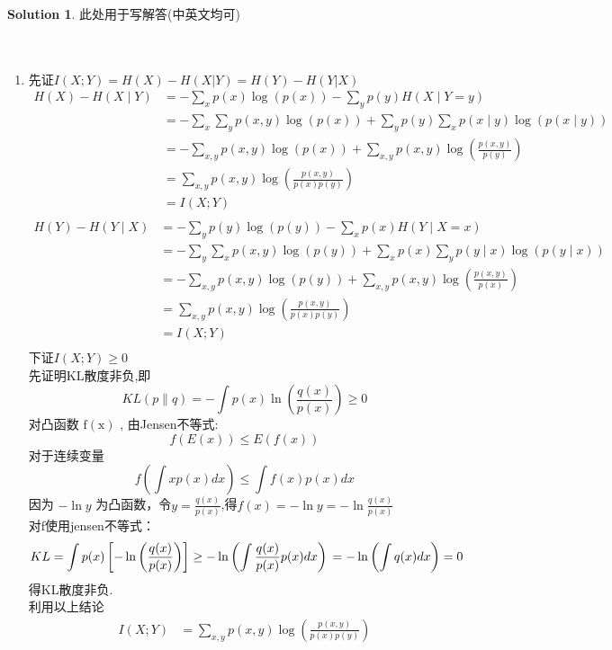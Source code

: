 \documentclass[a4paper,UTF8]{article}
\numberwithin{equation}{section}
\theoremstyle{definition}
\newtheorem*{solution}{Solution}
\begin{document}
\begin{solution}
此处用于写解答(中英文均可)
~\\
~\\
~\\
\begin{enumerate}
	\item[(1)]
	先证$I(X;Y) = H(X) - H(X|Y) = H(Y) - H(Y|X)$
\[
	\begin{aligned}
	H(X)-H(X \mid Y) & =-\sum_x p(x) \log (p(x))-\sum_y p(y) H(X \mid Y=y) \\
	& =-\sum_x \sum_y p(x, y) \log (p(x))+\sum_y p(y) \sum_x p(x \mid y) \log (p(x \mid y)) \\
	& =-\sum_{x, y} p(x, y) \log (p(x))+\sum_{x, y} p(x, y) \log \left(\frac{p(x, y)}{p(y)}\right) \\
	& =\sum_{x, y} p(x, y) \log \left(\frac{p(x, y)}{p(x) p(y)}\right) \\
	& =I(X;Y) \\
	\end{aligned}
\]
\[
	\begin{aligned}
	H(Y)-H(Y \mid X) & =-\sum_y p(y) \log (p(y))-\sum_x p(x) H(Y \mid X=x) \\
	& =-\sum_y \sum_x p(x, y) \log (p(y))+\sum_x p(x) \sum_y p(y \mid x) \log (p(y \mid x)) \\
	& =-\sum_{x, y} p(x, y) \log (p(y))+\sum_{x, y} p(x, y) \log \left(\frac{p(x, y)}{p(x)}\right) \\
	& =\sum_{x, y} p(x, y) \log \left(\frac{p(x, y)}{p(x) p(y)}\right) \\
	& =I(X;Y) \\
	\end{aligned}
\]
下证$I(X;Y)\geqslant 0$\\
先证明KL散度非负,即 \\ 
$$
K L(p \| q) =-\int p(x) \ln \left(\frac{q(x)}{p(x)}\right) \geq 0
$$
对凸函数 $\mathrm{f}(\mathrm{x})$ , 由Jensen不等式:
$$
f(E(x)) \leq E(f(x))
$$
对于连续变量
$$
f\left(\int x p(x) d x\right) \leq \int f(x) p(x) d x
$$
因为 $-\ln y$ 为凸函数，令$y=\frac{q(x)}{p(x)}$,得$f(x) = -\ln y=-\ln \frac{q(x)}{p(x)}$\\
对f使用jensen不等式：\\
$$
KL = \int p(x) \left[-\ln \left(\frac{q(x)}{p(x)}\right)\right] \geq-\ln \left(\int \frac{q(x)}{p(x)} p(x) d x\right) \\
=-\ln \left(\int q(x) d x\right)=0
$$
得KL散度非负.\\
利用以上结论
\[
	\begin{aligned}
		I(X;Y) & = \sum_{x, y} p(x, y) \log \left(\frac{p(x, y)}{p(x) p(y)}\right) \\

\end{aligned}\]
\end{enumerate}
\end{solution}
\end{document}
